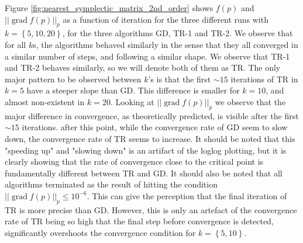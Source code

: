 Figure \ref{fig:nearest_symplectic_matrix_2nd_order} shows $f(p)$ and $\lvert \lvert \operatorname{grad}f(p) \rvert \rvert_{p}$ as a function of iteration for the three different runs with $k=\left\{ 5,10,20 \right\}$, for the three algorithms GD, TR-1 and TR-2. We observe that for all $k$s, the algorithms behaved similarly in the sense that they all converged in a similar number of steps, and following a similar shape. We observe that TR-1 and TR-2 behaves  similarly, so we will denote both of them as TR. The only major pattern to be observed between $k$'s is that the first $\sim 15$ iterations of TR in $k=5$ have a steeper slope than GD. This difference is smaller for $k=10$, and almost non-existent in $k=20$. Looking at $\lvert \lvert \operatorname{grad}f(p) \rvert \rvert_{p}$ we observe that the major difference in convergence, as theoretically predicted, is visible after the first $\sim 15$ iterations. after this point, while the convergence rate of GD seem to slow down, the convergence rate of TR seems to increase. It should be noted that this "speeding up" and "slowing down" is an artifact of the loglog plotting, but it is clearly showing that the rate of convergence close to the critical point is fundamentally different between TR and GD. It should also be noted that all algorithms terminated as the result of hitting the condition $\lvert \lvert \operatorname{grad}f(p) \rvert \rvert_{p}\leq10^{-6}$. This can give the perception that the final iteration of TR is more precise than GD. However, this is only an artefact of the convergence rate of TR being so high that the final step before convergence is detected, significantly overshoots the convergence condition for $k=\left\{ 5,10 \right\}$. 

